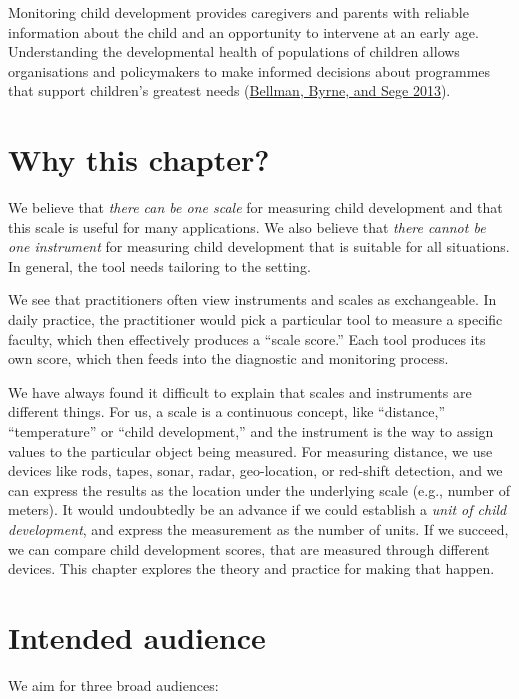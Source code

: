 \documentclass[
]{book}
\begin{document}
Monitoring child development provides caregivers and parents with reliable information about the child and an opportunity to intervene at an early age. Understanding the developmental health of populations of children allows organisations and policymakers to make informed decisions about programmes that support children's greatest needs (\protect\hyperlink{ref-bellman2013}{Bellman, Byrne, and Sege 2013}).

\hypertarget{sec:why}{%
\section{Why this chapter?}\label{sec:why}}

We believe that \emph{there can be one scale} for measuring child development and that this scale is useful for many applications. We also believe that \emph{there cannot be one instrument} for measuring child development that is suitable for all situations. In general, the tool needs tailoring to the setting.

We see that practitioners often view instruments and scales as exchangeable. In daily practice, the practitioner would pick a particular tool to measure a specific faculty, which then effectively produces a ``scale score.'' Each tool produces its own score, which then feeds into the diagnostic and monitoring process.

We have always found it difficult to explain that scales and instruments are different things. For us, a scale is a continuous concept, like ``distance,'' ``temperature'' or ``child development,'' and the instrument is the way to assign values to the particular object being measured. For measuring distance, we use devices like rods, tapes, sonar, radar, geo-location, or red-shift detection, and we can express the results as the location under the underlying scale (e.g., number of meters). It would undoubtedly be an advance if we could establish a \emph{unit of child development}, and express the measurement as the number of units. If we succeed, we can compare child development scores, that are measured through different devices. This chapter explores the theory and practice for making that happen.

\hypertarget{sec:audience}{%
\section{Intended audience}\label{sec:audience}}

We aim for three broad audiences:
\end{document}
